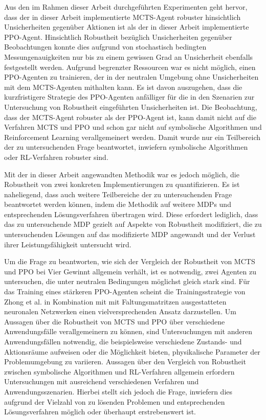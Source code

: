 Aus den im Rahmen dieser Arbeit durchgeführten Experimenten geht hervor, dass der in dieser Arbeit implementierte MCTS-Agent robuster hinsichtlich Unsicherheiten gegenüber Aktionen ist als der in dieser Arbeit implementierte PPO-Agent. Hinsichtlich Robustheit bezüglich Unsicherheiten gegenüber Beobachtungen konnte dies aufgrund von stochastisch bedingten Messungenauigkeiten nur bis zu einem gewissen Grad an Unsicherheit ebenfalls festgestellt werden. Aufgrund begrenzter Ressourcen war es nicht möglich, einen PPO-Agenten zu trainieren, der in der neutralen Umgebung ohne Unsicherheiten mit dem MCTS-Agenten mithalten kann. Es ist davon auszugehen, dass die kurzfristigere Strategie des PPO-Agenten anfälliger für die in den Szenarien zur Untersuchung von Robustheit eingeführten Unsicherheiten ist. Die Beobachtung, dass der MCTS-Agent robuster als der PPO-Agent ist, kann damit nicht auf die Verfahren MCTS und PPO und schon gar nicht auf symbolische Algorithmen und Reinforcement Learning verallgemeinert werden. Damit wurde nur ein Teilbereich der zu untersuchenden Frage beantwortet, inwiefern symbolische Algorithmen oder RL-Verfahren robuster sind.

Mit der in dieser Arbeit angewandten Methodik war es jedoch möglich, die Robustheit von zwei konkreten Implementierungen zu quantifizieren. Es ist naheliegend, dass auch weitere Teilbereiche der zu untersuchenden Frage beantwortet werden können, indem die Methodik auf weitere MDPs und entsprechenden Lösungsverfahren übertragen wird. Diese erfordert lediglich, dass das zu untersuchende MDP gezielt auf Aspekte von Robustheit modifiziert, die zu untersuchenden Lösungen auf das modifizierte MDP angewandt und der Verlust ihrer Leistungsfähigkeit untersucht wird.

Um die Frage zu beantworten, wie sich der Vergleich der Robustheit von MCTS und PPO bei Vier Gewinnt allgemein verhält, ist es notwendig, zwei Agenten zu untersuchen, die unter neutralen Bedingungen möglichst gleich stark sind. Für das Training eines stärkeren PPO-Agenten scheint die Trainingsstrategie von Zhong et al. in Kombination mit mit Faltungsmatritzen ausgestatteten neuronalen Netzwerken einen vielversprechenden Ansatz darzustellen. Um Aussagen über die Robustheit von MCTS und PPO über verschiedene Anwendungsfälle verallgemeinern zu können, sind Untersuchungen mit anderen Anwendungsfällen notwendig, die beispielsweise verschiedene Zustands- und Aktionsräume aufweisen oder die Möglichkeit bieten, physikalische Parameter der Problemumgebung zu variieren. Aussagen über den Vergleich von Robustheit zwischen symbolische Algorithmen und RL-Verfahren allgemein erfordern Untersuchungen mit ausreichend verschiedenen Verfahren und Anwendungsszenarien. Hierbei stellt sich jedoch die Frage, inwiefern dies aufgrund der Vielzahl von zu lösenden Problemen und entsprechenden Lösungsverfahren möglich oder überhaupt erstrebenswert ist.
